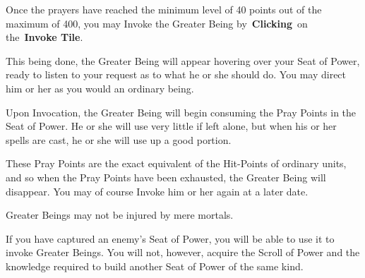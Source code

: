 Once the prayers have reached the minimum level of 40 points out of the maximum of 400, you may Invoke the Greater Being by \textbf{Clicking} on the \textbf{Invoke Tile}.

This being done, the Greater Being will appear hovering over your Seat of Power, ready to listen to your request as to what he or she should do. You may direct him or her as you would an ordinary being.

Upon Invocation, the Greater Being will begin consuming the Pray Points in the Seat of Power. He or she will use very little if left alone, but when his or her spells are cast, he or she will use up a good portion.

These Pray Points are the exact equivalent of the Hit-Points of ordinary units, and so when the Pray Points have been exhausted, the Greater Being will disappear. You may of course Invoke him or her again at a later date.

Greater Beings may not be injured by mere mortals.

If you have captured an enemy’s Seat of Power, you will be able to use it to invoke Greater Beings. You will not, however, acquire the Scroll of Power and the knowledge required to build another Seat of Power of the same kind.
